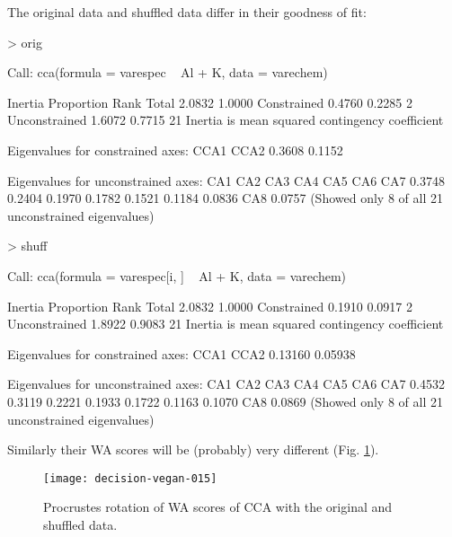 \documentclass[a4paper,10pt,twocolumn]{article}
\begin{document}
The original data and shuffled data differ in their goodness of
fit:
\begin{Schunk}
\begin{Sinput}
> orig
\end{Sinput}
\begin{Soutput}
Call: cca(formula = varespec ~ Al + K, data =
varechem)

              Inertia Proportion Rank
Total          2.0832     1.0000     
Constrained    0.4760     0.2285    2
Unconstrained  1.6072     0.7715   21
Inertia is mean squared contingency coefficient 

Eigenvalues for constrained axes:
  CCA1   CCA2 
0.3608 0.1152 

Eigenvalues for unconstrained axes:
   CA1    CA2    CA3    CA4    CA5    CA6    CA7 
0.3748 0.2404 0.1970 0.1782 0.1521 0.1184 0.0836 
   CA8 
0.0757 
(Showed only 8 of all 21 unconstrained eigenvalues)
\end{Soutput}
\begin{Sinput}
> shuff
\end{Sinput}
\begin{Soutput}
Call: cca(formula = varespec[i, ] ~ Al + K, data
= varechem)

              Inertia Proportion Rank
Total          2.0832     1.0000     
Constrained    0.1910     0.0917    2
Unconstrained  1.8922     0.9083   21
Inertia is mean squared contingency coefficient 

Eigenvalues for constrained axes:
   CCA1    CCA2 
0.13160 0.05938 

Eigenvalues for unconstrained axes:
   CA1    CA2    CA3    CA4    CA5    CA6    CA7 
0.4532 0.3119 0.2221 0.1933 0.1722 0.1163 0.1070 
   CA8 
0.0869 
(Showed only 8 of all 21 unconstrained eigenvalues)
\end{Soutput}
\end{Schunk}
Similarly their WA scores will be (probably) very different
(Fig. \ref{fig:ccawa}).
\begin{figure}
\texttt{[image: decision-vegan-015]}
\caption{Procrustes rotation of WA scores of CCA with the original and
  shuffled data.}
\label{fig:ccawa}
\end{figure}
\end{document}
